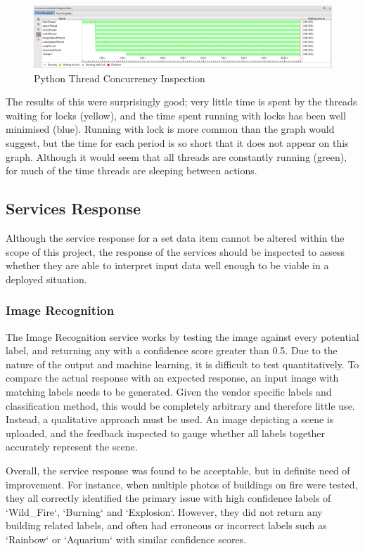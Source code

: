 \documentclass{article}
\begin{document}
\begin{figure}[h]
\centering
\caption{Python Thread Concurrency Inspection\label{fig:Concurrency}}
\includegraphics[width=\textwidth]{Concurrency}
\end{figure}

The results of this were surprisingly good; very little time is spent by the threads waiting for locks (yellow), and the time spent running with locks has been well minimised (blue). Running with lock is more common than the graph would suggest, but the time for each period is so short that it does not appear on this graph. Although it would seem that all threads are constantly running (green), for much of the time threads are sleeping between actions.   


\subsection{Services Response}
Although the service response for a set data item cannot be altered within the scope of this project, the response of the services should be inspected to assess whether they are able to interpret input data well enough to be viable in a deployed situation. 

\subsubsection{Image Recognition}
The Image Recognition service works by testing the image against every potential label, and returning any with a confidence score greater than 0.5. Due to the nature of the output and machine learning, it is difficult to test quantitatively. To compare the actual response with an expected response, an input image with matching labels needs to be generated. Given the vendor specific labels and classification method, this would be completely arbitrary and therefore little use. Instead, a qualitative approach must be used. An image depicting a scene is uploaded, and the feedback inspected to gauge whether all labels together accurately represent the scene. 

Overall, the service response was found to be acceptable, but in definite need of improvement. For instance, when multiple photos of buildings on fire were tested, they all correctly identified the primary issue with high confidence labels of `Wild\_Fire`, `Burning` and `Explosion`. However, they did not return any building related labels, and often had erroneous or incorrect labels such as `Rainbow` or `Aquarium` with similar confidence scores. 
\end{document}
